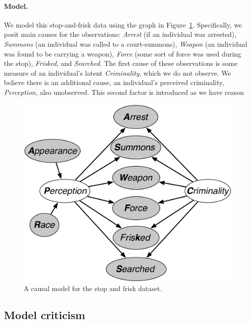 \paragraph{Model.}
We model this stop-and-frisk data using the graph in Figure~\ref{figure.stop_and_frisk}. Specifically, we posit main causes for the observations: \emph{Arrest} (if an individual was arrested), \emph{Summons} (an individual was called to a court-summons), \emph{Weapon} (an individual was found to be carrying a weapon), \emph{Force} (some sort of force was used during the stop), \emph{Frisked}, and \emph{Searched}. The first cause of these observations is some measure of an individual's latent \emph{Criminality}, which we do not observe. We believe there is an additional cause, an individual's perceived criminality, \emph{Perception}, also unobserved. This second factor is introduced as we have reason


\begin{figure}[th]
\begin{center}
\vspace{-1ex}
\centerline{\includegraphics[width=\columnwidth]{stop_and_frisk_model3.pdf}}
\vspace{-2ex}
\caption{A causal model for the stop and frisk dataset.\label{figure.stop_and_frisk}}
\vspace{-2ex}
\end{center}
\end{figure}


\subsection{Model criticism}
